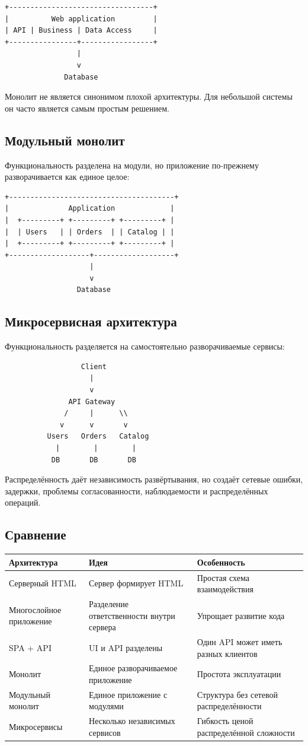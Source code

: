 \documentclass[12pt,a4paper]{article}
\begin{document}
\begin{verbatim}
+----------------------------------+
|          Web application         |
| API | Business | Data Access     |
+----------------+-----------------+
                 |
                 v
              Database
\end{verbatim}

Монолит не является синонимом плохой архитектуры. Для небольшой системы он часто является самым простым решением.

\subsection{Модульный монолит}
Функциональность разделена на модули, но приложение по-прежнему разворачивается как единое целое:
\begin{verbatim}
+---------------------------------------+
|              Application             |
|  +---------+ +---------+ +---------+ |
|  | Users   | | Orders  | | Catalog | |
|  +---------+ +---------+ +---------+ |
+-------------------+-------------------+
                    |
                    v
                 Database
\end{verbatim}

\subsection{Микросервисная архитектура}
Функциональность разделяется на самостоятельно разворачиваемые сервисы:
\begin{verbatim}
                  Client
                    |
                    v
               API Gateway
              /     |      \\
             v      v       v
          Users   Orders   Catalog
            |        |        |
           DB       DB       DB
\end{verbatim}
Распределённость даёт независимость развёртывания, но создаёт сетевые ошибки, задержки, проблемы согласованности, наблюдаемости и распределённых операций.

\subsection{Сравнение}
\begin{longtable}{@{}p{}p{}p{}@{}}
\toprule
Архитектура & Идея & Особенность\\
\midrule
Серверный HTML & Сервер формирует HTML & Простая схема взаимодействия\\
Многослойное приложение & Разделение ответственности внутри сервера & Упрощает развитие кода\\
SPA + API & UI и API разделены & Один API может иметь разных клиентов\\
Монолит & Единое разворачиваемое приложение & Простота эксплуатации\\
Модульный монолит & Единое приложение с модулями & Структура без сетевой распределённости\\
Микросервисы & Несколько независимых сервисов & Гибкость ценой распределённой сложности\\
\bottomrule
\end{longtable}
\end{document}
